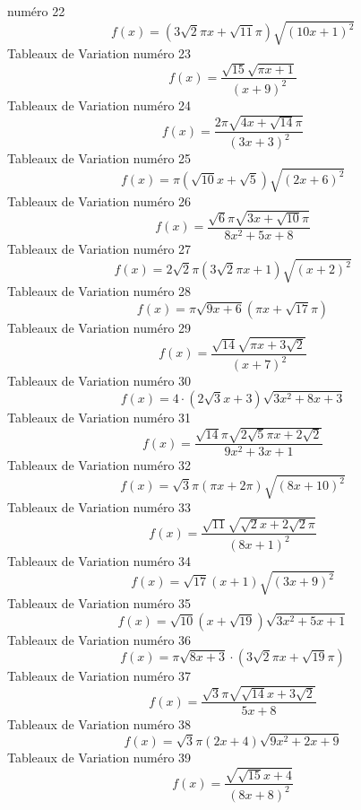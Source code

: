 \documentclass{article}
\begin{document}
num\'ero 22 \[f(x) = \left(3 \sqrt{2} \pi x + \sqrt{11} \pi\right) \sqrt{\left(10 x + 1\right)^{2}}\]Tableaux de Variation num\'ero 23 \[f(x) = \frac{\sqrt{15} \sqrt{\pi x + 1}}{\left(x + 9\right)^{2}}\]Tableaux de Variation num\'ero 24 \[f(x) = \frac{2 \pi \sqrt{4 x + \sqrt{14} \pi}}{\left(3 x + 3\right)^{2}}\]Tableaux de Variation num\'ero 25 \[f(x) = \pi \left(\sqrt{10} x + \sqrt{5}\right) \sqrt{\left(2 x + 6\right)^{2}}\]Tableaux de Variation num\'ero 26 \[f(x) = \frac{\sqrt{6} \pi \sqrt{3 x + \sqrt{10} \pi}}{8 x^{2} + 5 x + 8}\]Tableaux de Variation num\'ero 27 \[f(x) = 2 \sqrt{2} \pi \left(3 \sqrt{2} \pi x + 1\right) \sqrt{\left(x + 2\right)^{2}}\]Tableaux de Variation num\'ero 28 \[f(x) = \pi \sqrt{9 x + 6} \left(\pi x + \sqrt{17} \pi\right)\]Tableaux de Variation num\'ero 29 \[f(x) = \frac{\sqrt{14} \sqrt{\pi x + 3 \sqrt{2}}}{\left(x + 7\right)^{2}}\]Tableaux de Variation num\'ero 30 \[f(x) = 4 \cdot \left(2 \sqrt{3} x + 3\right) \sqrt{3 x^{2} + 8 x + 3}\]Tableaux de Variation num\'ero 31 \[f(x) = \frac{\sqrt{14} \pi \sqrt{2 \sqrt{5} \pi x + 2 \sqrt{2}}}{9 x^{2} + 3 x + 1}\]Tableaux de Variation num\'ero 32 \[f(x) = \sqrt{3} \pi \left(\pi x + 2 \pi\right) \sqrt{\left(8 x + 10\right)^{2}}\]Tableaux de Variation num\'ero 33 \[f(x) = \frac{\sqrt{11} \sqrt{\sqrt{2} x + 2 \sqrt{2} \pi}}{\left(8 x + 1\right)^{2}}\]Tableaux de Variation num\'ero 34 \[f(x) = \sqrt{17} \left(x + 1\right) \sqrt{\left(3 x + 9\right)^{2}}\]Tableaux de Variation num\'ero 35 \[f(x) = \sqrt{10} \left(x + \sqrt{19}\right) \sqrt{3 x^{2} + 5 x + 1}\]Tableaux de Variation num\'ero 36 \[f(x) = \pi \sqrt{8 x + 3} \cdot \left(3 \sqrt{2} \pi x + \sqrt{19} \pi\right)\]Tableaux de Variation num\'ero 37 \[f(x) = \frac{\sqrt{3} \pi \sqrt{\sqrt{14} x + 3 \sqrt{2}}}{5 x + 8}\]Tableaux de Variation num\'ero 38 \[f(x) = \sqrt{3} \pi \left(2 x + 4\right) \sqrt{9 x^{2} + 2 x + 9}\]Tableaux de Variation num\'ero 39 \[f(x) = \frac{\sqrt{\sqrt{15} x + 4}}{\left(8 x + 8\right)^{2}}\]
\end{document}
